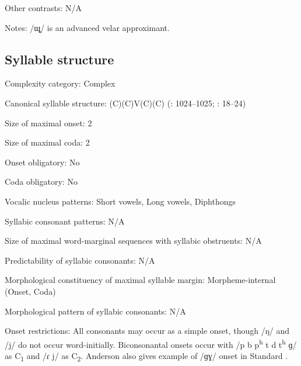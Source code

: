 {\begin{appendixdesc}
\item[Other contrasts:] N/A

\item[Notes:] /ɰ̟/ is an advanced velar approximant.
\end{appendixdesc}
\subsection*{Syllable structure}
\begin{appendixdesc}

\item[Complexity category:] Complex

\item[Canonical syllable structure:] (C)(C)V(C)(C) (\citealt{Anderson1997}: 1024--1025; \citealt{Yoshioka2012}: 18--24)

\item[Size of maximal onset:] 2

\item[Size of maximal coda:] 2

\item[Onset obligatory:] No

\item[Coda obligatory:] No

\item[Vocalic nucleus patterns:] Short vowels, Long vowels, Diphthongs

\item[Syllabic consonant patterns:] N/A

\item[Size of maximal word-marginal sequences with syllabic obstruents:] N/A

\item[Predictability of syllabic consonants:] N/A

\item[Morphological constituency of maximal syllable margin:] Morpheme-internal (Onset, Coda)

\item[Morphological pattern of syllabic consonants:] N/A

\item[Onset restrictions:] All consonants may occur as a simple onset, though /ŋ/ and /j/ do not occur word-initially. Biconsonantal onsets occur with /p b p\textsuperscript{h} t d t\textsuperscript{h} ɡ/ as C\textsubscript{1} and /ɾ j/ as C\textsubscript{2}. Anderson also gives example of /ɡɣ/ onset in Standard .


\end{appendixdesc}}
